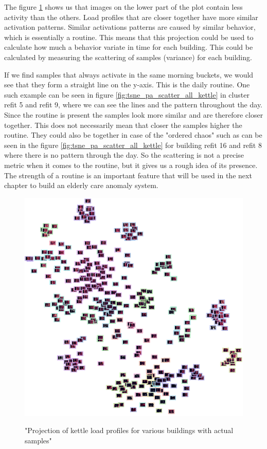 The figure \ref{fig:tsne_pa_img_scatter_all_kettle} shows us that images on the lower part 
of the plot contain less activity than the others. 
Load profiles that are closer together have more similar activation patterns.
Similar activations patterns are caused by similar behavior, which is essentially a routine.
This means that this projection could be used to calculate how much a behavior variate in time for each building.
This could be calculated by measuring the scattering of samples (variance) for each building.

If we find samples that always activate in the same morning buckets, we would see that they form a straight line on the y-axis.
This is the daily routine. One such example can be seen in figure \ref{fig:tsne_pa_scatter_all_kettle} in cluster refit 5 and refit 9, where we can see the lines and the pattern throughout the day. 
Since the routine is present the samples look more similar and are therefore closer together. 
This does not necessarily mean that closer the samples higher the routine.
They could also be together in case of the "ordered chaos" such as can be seen in the figure \ref{fig:tsne_pa_scatter_all_kettle} for building refit 16 and refit 8 where there is no pattern through the day.
So the scattering is not a precise metric when it comes to the routine, but it gives us a rough idea of its presence.
The strength of a routine is an important feature that will be used
in the next chapter to build an elderly care anomaly system.

\begin{figure}[H]
	\centering
	\caption{"Projection of kettle load profiles for various buildings with actual samples"}
	\includegraphics[width=.9\textwidth]{Figures/TSNE/TSNE_per_appliance/all/img_scatter_allkettle.png}
	\label{fig:tsne_pa_img_scatter_all_kettle}
\end{figure}

